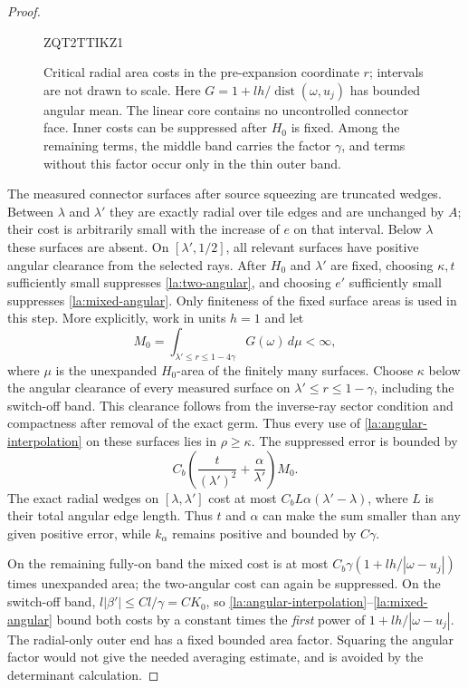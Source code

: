 \documentclass[11pt]{article}
\numberwithin{equation}{section}
\theoremstyle{definition}
\theoremstyle{remark}
\begin{document}
\begin{proof}
\begin{figure}[tb]

ZQT2TTIKZ1
\caption{Critical radial area costs in the pre-expansion coordinate
$r$; intervals are not drawn to scale.  Here
$G=1+lh/\operatorname{dist}(\omega,u_j)$ has bounded angular mean.  The linear core
contains no uncontrolled connector face.  Inner costs can be
suppressed after $H_0$ is fixed.  Among the remaining terms, the middle
band carries the factor $\gamma$, and terms without this factor occur
only in the thin outer band.}
\label{la:radial-bands}
\end{figure}

The measured connector surfaces after source squeezing are truncated
wedges.  Between $\lambda$ and $\lambda'$ they are exactly radial
over tile edges and are unchanged by $A$; their cost is arbitrarily
small with the increase of $e$ on that interval.  Below $\lambda$
these surfaces are absent.  On $[\lambda',1/2]$, all relevant
surfaces have positive angular clearance from the selected rays.
After $H_0$ and $\lambda'$ are fixed, choosing $\kappa,t$ sufficiently
small suppresses \eqref{la:two-angular}, and choosing $e'$ sufficiently
small suppresses \eqref{la:mixed-angular}.  Only finiteness of the
fixed surface areas is used in this step.  More explicitly, work in
units $h=1$ and let
\[
 M_0=\int_{\lambda'\le r\le1-4\gamma}G(\omega)\,d\mu<\infty,
\]
where $\mu$ is the unexpanded $H_0$-area of the finitely many surfaces.
Choose $\kappa$ below the angular clearance of every measured
surface on $\lambda'\le r\le1-\gamma$, including the switch-off
band.  This clearance follows from the inverse-ray sector condition
and compactness after removal of the exact germ.  Thus every use of
\eqref{la:angular-interpolation} on these surfaces lies in
$\rho\ge\kappa$.  The suppressed error is bounded by
\[
 C_b\left(\frac{t}{(\lambda')^2}
                +\frac{\alpha}{\lambda'}\right)M_0.
\]
The exact radial wedges on $[\lambda,\lambda']$ cost at most
$C_b L\alpha(\lambda'-\lambda)$, where $L$ is their total angular
edge length.  Thus $t$ and $\alpha$ can make the sum smaller than any
given positive error, while $k_\alpha$ remains positive and bounded
by $C\gamma$.

On the remaining fully-on band the mixed cost is at most
$C_b\gamma(1+lh/|\omega-u_j|)$ times unexpanded area; the
two-angular cost can again be suppressed.  On the switch-off band,
$l|\beta'|\le C l/\gamma=CK_0$, so
\eqref{la:angular-interpolation}--\eqref{la:mixed-angular} bound both
costs by a constant times the \emph{first} power of
$1+lh/|\omega-u_j|$.  The radial-only outer end has a fixed bounded
area factor.  Squaring the angular factor would not give the needed
averaging estimate, and is avoided by the determinant calculation.


\end{proof}
\end{document}
